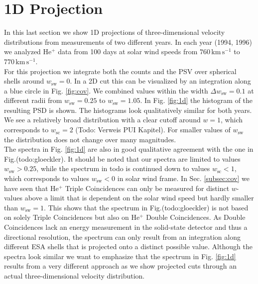 \section{1D Projection}
In this last section we show 1D projections of three-dimensional velocity distributions from measurements of two different years. In each year (1994, 1996) we analyzed $\mathrm{He^{+}}$ data from 100 days at solar wind speeds from $760 \, \mathrm{km\,s^{-1}}$ to $770 \, \mathrm{km\,s^{-1}}$.\\
For this projection we integrate both the counts and the PSV over spherical shells around $w_\mathrm{sw}=0$. In a 2D cut this can be visualized by an integration along a blue circle in Fig. \ref{fig:cov}. We combined values within the width $\Delta w_\mathrm{sw} = 0.1$ at different radii from $w_\mathrm{sw} = 0.25$ to $w_\mathrm{sw} = 1.05$. In Fig. \ref{fig:1d} the histogram of the resulting PSD is shown. The histograms look qualitatively similar for both years. 
We see a relatively broad distribution with a clear cutoff around $w = 1$, which corresponds to $w_\mathrm{sc} = 2$ (Todo: Verweis PUI Kapitel). For smaller values of $w_\mathrm{sw}$ the distribution does not change over many magnitudes. 
\\
The spectra in Fig. \ref{fig:1d} are also in good qualitative agreement with the one in Fig.(todo:gloeckler). It should be noted that our spectra are limited to values $w_\mathrm{sw} > 0.25$, while the spectrum in todo is continued down to values $w_\mathrm{sc} < 1$, which corresponds to values $w_\mathrm{sw} < 0$ in solar wind frame. 
In Sec. \ref{subsec:cov} we have seen that $\mathrm{He^{+}}$ Triple Coincidences can only be measured for distinct $w$-values above a limit that is dependent on the solar wind speed but hardly smaller than $w_\mathrm{sw} = 1$. This shows that the spectrum in Fig.(todo:gloeckler) is not based on solely Triple Coincidences but also on $\mathrm{He^{+}}$ Double Coincidences. As Double Coincidences lack an energy measurement in the solid-state detector and thus a directional resolution, the spectrum can only result from an integration along different ESA shells that is projected onto a distinct possible value.
Although the spectra look similar we want to emphasize that the spectrum in Fig. \ref{fig:1d} results from a very different approach as we show projected cuts through an actual three-dimensional velocity distribution.
